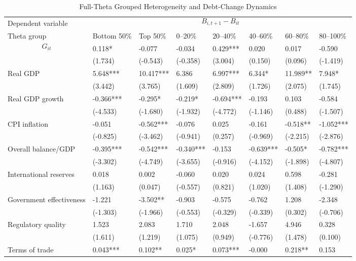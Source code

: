 \begin{table}[H]\centering
\begin{threeparttable}
\caption{Full-Theta Grouped Heterogeneity and Debt-Change Dynamics}
\label{tab:theta_group_heterogeneity_debt}
\scriptsize
\begin{tabularx}{\textwidth}{lYYYYYYY}
\toprule
Dependent variable &  \\
\cmidrule(lr){2-8}
Theta group & Bottom 50\% & Top 50\% & 0--20\% & 20--40\% & 40--60\% & 60--80\% & 80--100\% \\
\midrule
$$G_{it}$$ & 0.118* & -0.077 & -0.034 & 0.429*** & 0.020 & 0.017 & -0.590 \\
  & (1.734) & (-0.543) & (-0.358) & (3.004) & (0.150) & (0.096) & (-1.419) \\
Real GDP & 5.648*** & 10.417*** & 6.386 & 6.997*** & 6.344* & 11.989** & 7.948* \\
  & (3.442) & (3.765) & (1.609) & (2.809) & (1.726) & (2.075) & (1.745) \\
Real GDP growth & -0.366*** & -0.295* & -0.219* & -0.694*** & -0.193 & 0.103 & -0.584 \\
  & (-4.533) & (-1.680) & (-1.932) & (-4.772) & (-1.146) & (0.488) & (-1.507) \\
CPI inflation & -0.051 & -0.562*** & -0.076 & 0.025 & -0.161 & -0.518** & -1.052*** \\
  & (-0.825) & (-3.462) & (-0.941) & (0.257) & (-0.969) & (-2.215) & (-2.876) \\
Overall balance/GDP & -0.395*** & -0.542*** & -0.340*** & -0.153 & -0.639*** & -0.505* & -0.782*** \\
  & (-3.302) & (-4.749) & (-3.655) & (-0.916) & (-4.152) & (-1.898) & (-4.807) \\
International reserves & 0.018 & 0.002 & -0.060 & 0.020 & 0.024 & 0.598 & -0.281 \\
  & (1.163) & (0.047) & (-0.557) & (0.821) & (1.020) & (1.408) & (-1.290) \\
Government effectiveness & -1.221 & -3.502** & -0.903 & -0.575 & -0.762 & 1.208 & -2.348 \\
  & (-1.303) & (-1.966) & (-0.553) & (-0.329) & (-0.339) & (0.302) & (-0.706) \\
Regulatory quality & 1.523 & 2.083 & 1.710 & 2.048 & -1.657 & 4.946 & 0.328 \\
  & (1.611) & (1.219) & (1.075) & (0.949) & (-0.776) & (1.478) & (0.100) \\
Terms of trade & 0.043*** & 0.102** & 0.025* & 0.073*** & -0.000 & 0.218** & 0.153 \\

\end{tabularx}
\end{threeparttable}
\end{table}
